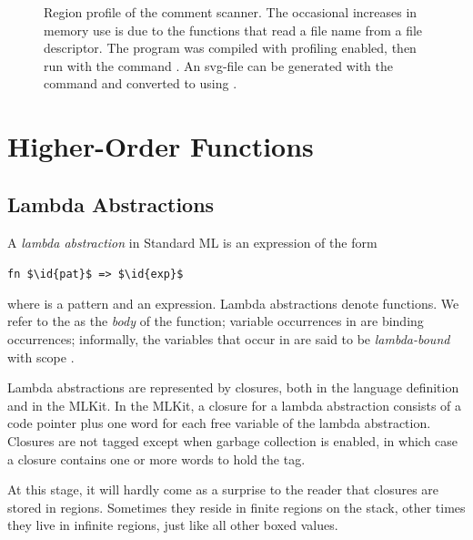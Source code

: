 \documentclass[12pt]{book}
\begin{document}
\begin{figure}
\caption{Region profile of the comment scanner. The occasional increases in
  memory use is due to the functions that read a file name from a file
  descriptor.  The program was compiled with profiling enabled, then run with
  the command .  An svg-file  can be generated with the command  and converted to  using
  . }
\label{scan.fig}
\end{figure}


\chapter{Higher-Order Functions}
\label{hof.sec}

\section{Lambda Abstractions}

A \emph{lambda abstraction}
%
%
%
%
in Standard ML is an expression of the form
\begin{center}
  \lstinline!fn $\id{pat}$ => $\id{exp}$!
\end{center}
where  is a pattern and  an expression.  Lambda abstractions
denote functions.  We refer to the  as the \emph{body} of the function;
variable occurrences in  are binding occurrences; informally, the
variables that occur in  are said to be
%
%
\emph{lambda-bound} with scope .

Lambda abstractions are represented by closures, both in the language definition
and in the MLKit. In the MLKit, a closure for a lambda abstraction consists of a
code pointer plus one word for each free variable of the lambda
abstraction. Closures are not tagged except when garbage collection is enabled,
in which case a closure contains one or more words to hold the tag.

At this stage, it will hardly come as a surprise to the reader that closures are
stored in regions.  Sometimes they reside in finite regions on the stack, other
times they live in infinite regions, just like all other boxed values.
\end{document}
